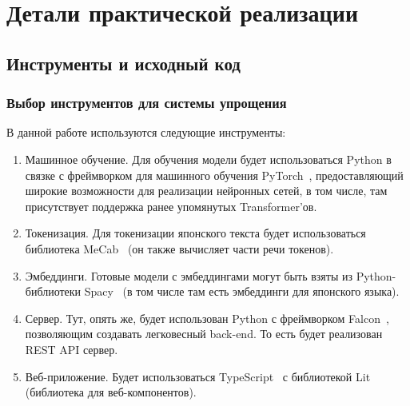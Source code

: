 



\chapter{Детали практической реализации}


\section{Инструменты и исходный код}


\subsection{Выбор инструментов для системы упрощения}


В данной работе используются следующие инструменты:
\begin{enumerate}[1.]%
  \item Машинное обучение. Для обучения модели будет использоваться Python в связке с фреймворком для машинного обучения PyTorch~\cite{PyTorch}, предоставляющий широкие возможности для реализации нейронных сетей, в том числе, там присутствует поддержка ранее упомянутых Transformer'ов.
  \item Токенизация. Для токенизации японского текста будет использоваться библиотека MeCab~\cite{MeCab} (он также вычисляет части речи токенов).
  \item Эмбеддинги. Готовые модели с эмбеддингами могут быть взяты из Python-библиотеки Spacy~\cite{Spacy} (в том числе там есть эмбеддинги для японского языка).
  \item Сервер. Тут, опять же, будет использован Python с фреймворком Falcon~\cite{Falcon}, позволяющим создавать легковесный back-end. То есть будет реализован REST API сервер.
  \item Веб-приложение. Будет использоваться TypeScript~\cite{TypeScript} с библиотекой Lit~\cite{Lit} (библиотека для веб-компонентов).
\end{enumerate}

